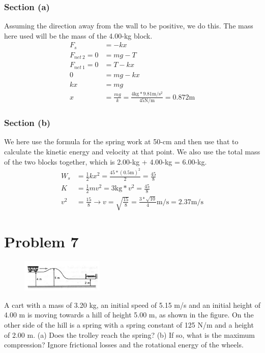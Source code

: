 \documentclass[12pt]{article}
\begin{document}
\subsubsection*{Section (a)}
Assuming the direction away from the wall to be positive, we do this. The mass here used will be the mass of the 4.00-kg block. 
\begin{align*}
    F_s &= -kx\\
    F_{net\ 2} = 0 &= mg - T\\
    F_{net\ 1} = 0 &= T - kx\\
    0   &=  mg - kx\\
    kx  &=  mg\\
    x   &=  \frac{mg}{k} = \frac{4\unit{\kilo\gram}*9.81\unit{\meter/\second^2}}{45\unit{\newton/\meter}} = \boxed{0.872\unit{\meter}}
\end{align*}

\subsubsection*{Section (b)}
We here use the formula for the spring work at 50-cm and then use that to calculate the kinetic energy and velocity at that point. We also use the total mass of the two blocks together, which is 2.00-kg + 4.00-kg = 6.00-kg.
\begin{align*}
    W_s &=  \frac{1}{2} kx^2 = \frac{45*(0.5\unit{\meter})^2}{2} = \frac{45}{8}\\
    K   &=  \frac{1}{2}mv^2 = 3\unit{\kilo\gram}*v^2 = \frac{45}{8}\\
    v^2 &=  \frac{15}{8}\rightarrow
    v   =  \sqrt{\frac{15}{8}} = \boxed{\frac{3*\sqrt{10}}{4} \unit{\meter/\second} = 2.37 \unit{\meter/\second}}
\end{align*}

\pagebreak
\section*{Problem 7}
\begin{figure}
    \vspace{-30pt}
    \includegraphics[width=0.35\textwidth]{graph_7.png} 
\end{figure}
A cart with a mass of 3.20 kg, an initial speed of 5.15 m/s and an initial height of 4.00 m is moving towards a hill of height 5.00 m, as shown in the figure. On the other side of the hill is a spring with a spring constant of 125 N/m and a height of 2.00 m. (a) Does the trolley reach the spring? (b) If so, what is the maximum compression? Ignore frictional losses and the rotational energy of the wheels.
\end{document}
